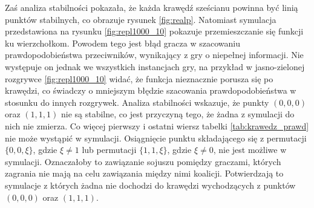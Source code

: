 Zaś analiza stabilności pokazała, że każda krawędź sześcianu powinna być linią punktów stabilnych, co obrazuje rysunek \ref{fig:realp}. Natomiast symulacja przedstawiona na rysunku \ref{fig:repl1000_10} pokazuje przemieszczanie się funkcji ku wierzchołkom. Powodem tego jest błąd gracza w szacowaniu prawdopodobieństwa przeciwników, wynikający z gry o niepełnej informacji. Nie występuje on jednak we wszystkich instancjach gry, na przykład w jasno-zielonej rozgrywce \ref{fig:repl1000_10} widać, że funkcja nieznacznie porusza się po krawędzi, co świadczy o mniejszym błędzie szacowania prawdopodobieństwa w stosunku do innych rozgrywek. Analiza stabilności wskazuje, że punkty $(0,0,0)$ oraz $(1,1,1)$ nie są stabilne, co jest przyczyną tego, że żadna z symulacji do nich nie zmierza. Co więcej pierwszy i ostatni wiersz tabelki \ref{tab:krawedz_prawd} nie może wystąpić w symulacji. Osiągnięcie punktu składającego się z permutacji $\{0,0,\xi \}$, gdzie $\xi \neq 1$ lub permutacji $\{1,1,\xi \}$, gdzie $\xi \neq 0$, nie jest możliwe w symulacji. Oznaczałoby to zawiązanie sojuszu pomiędzy graczami, których zagrania nie mają na celu zawiązania między nimi koalicji. Potwierdzają to symulacje z których żadna nie dochodzi do krawędzi wychodzących z punktów $(0,0,0)$ oraz $(1,1,1)$.


